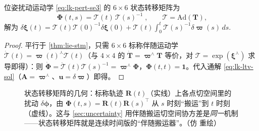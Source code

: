 \begin{theorem}[$\SE(3)$ 扰动的解析状态转移矩阵]\label{thm:lie-stm-se3}
位姿扰动运动学 \cref{eq:lk-pert-se3} 的 $6\times6$ 状态转移矩阵为
\begin{equation}
  \boxed{\;\boldsymbol{\Phi}(t,s)=\boldsymbol{\mathcal{T}}(t)\,\boldsymbol{\mathcal{T}}(s)^{-1}\;},\qquad \boldsymbol{\mathcal{T}}=\mathrm{Ad}(\mathbf{T}),
  \label{eq:lk-stm-se3}
\end{equation}
解为 $\displaystyle\delta\boldsymbol{\xi}(t)=\boldsymbol{\mathcal{T}}(t)\boldsymbol{\mathcal{T}}(0)^{-1}\delta\boldsymbol{\xi}(0)+\boldsymbol{\mathcal{T}}(t)\!\int_0^t\boldsymbol{\mathcal{T}}(s)^{-1}\delta\boldsymbol{\varpi}(s)\,ds.$
\end{theorem}
\begin{proof}
平行于 \cref{thm:lie-stm}，只需 $6\times6$ 标称伴随运动学 $\dot{\boldsymbol{\mathcal{T}}}(t)=\boldsymbol{\varpi}(t)^\curlywedge\boldsymbol{\mathcal{T}}(t)$（与 $4\times4$ 的 $\dot{\mathbf{T}}=\boldsymbol{\varpi}^\wedge\mathbf{T}$ 等价，对 $\boldsymbol{\mathcal{T}}=\exp(\boldsymbol{\xi}^\curlywedge)$ 求导即得）：则 $\dot{\boldsymbol{\Phi}}=\dot{\boldsymbol{\mathcal{T}}}(t)\boldsymbol{\mathcal{T}}(s)^{-1}=\boldsymbol{\varpi}^\curlywedge\boldsymbol{\Phi}$，$\boldsymbol{\Phi}(t,t)=\mathbf{1}$。代入通解 \cref{eq:lk-ltv-sol}（$\mathbf{A}=\boldsymbol{\varpi}^\curlywedge$、$\mathbf{u}=\delta\boldsymbol{\varpi}$）即得。
\end{proof}

\begin{figure}[ht]
\centering
{}
\caption{状态转移矩阵的几何：标称轨迹 $\mathbf{R}(t)$（实线）上各点切空间里的扰动 $\delta\boldsymbol{\phi}$，由 $\boldsymbol{\Phi}(t,s)=\mathbf{R}(t)\mathbf{R}(s)^\top$ 从 $s$ 时刻“搬运”到 $t$ 时刻（虚线）。这与 \cref{sec:uncertainty} 用伴随搬运切空间协方差是\emph{同一}机制——状态转移矩阵就是连续时间版的“伴随搬运器”。（仿 \cite{barfoot2024state} 重绘）}
\label{fig:lie-stm}
\end{figure}

